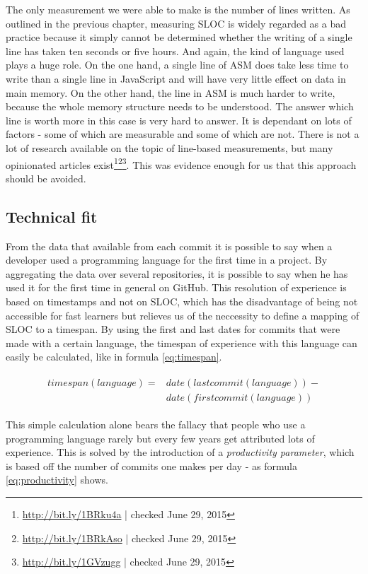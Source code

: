 The only measurement we were able to make is the number of lines written. As outlined in the previous chapter, measuring SLOC is widely regarded as a bad practice because it simply cannot be determined whether the writing of a single line has taken ten seconds or five hours. And again, the kind of language used plays a huge role. On the one hand, a single line of ASM does take less time to write than a single line in JavaScript and will have very little effect on data in main memory. On the other hand, the line in ASM is much harder to write, because the whole memory structure needs to be understood. The answer which line is worth more in this case is very hard to answer. It is dependant on lots of factors - some of which are measurable and some of which are not. There is not a lot of research available on the topic of line-based measurements, but many opinionated articles exist\cite{mlya:2012}\footnote{\url{http://bit.ly/1BRku4a} | checked June 29, 2015}\footnote{\url{http://bit.ly/1BRkAso} | checked June 29, 2015}\footnote{\url{http://bit.ly/1GVzugg} | checked June 29, 2015}. This was evidence enough for us that this approach should be avoided.

\subsection{Technical fit}\label{sec:technicalfit}
From the data that available from each commit it is possible to say when a developer used a programming language for the first time in a project. By aggregating the data over several repositories, it is possible to say when he has used it for the first time in general on GitHub. This resolution of experience is based on timestamps and not on SLOC, which has the disadvantage of being not accessible for fast learners but relieves us of the neccessity to define a mapping of SLOC to a timespan. By using the first and last dates for commits that were made with a certain language, the timespan of experience with this language can easily be calculated, like in formula \ref{eq:timespan}.

\begin{align}
\begin{split}\label{eq:timespan}
timespan(language) ={}& date(lastcommit(language)) - \\
                      & date(firstcommit(language))
\end{split}
\end{align}

This simple calculation alone bears the fallacy that people who use a programming language rarely but every few years get attributed lots of experience. This is solved by the introduction of a \textit{productivity parameter}, which is based off the number of commits one makes per day - as formula \ref{eq:productivity} shows.

